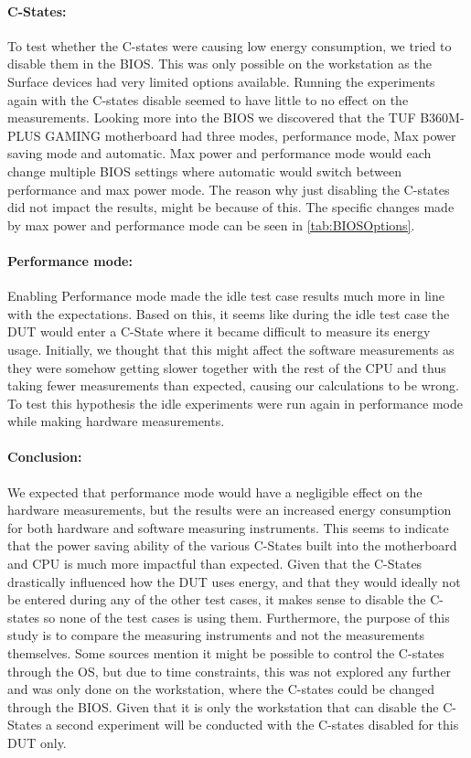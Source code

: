 \paragraph{C-States:} To test whether the C-states were causing low energy consumption, we tried to disable them in the BIOS. This was only possible on the workstation as the Surface devices had very limited options available. Running the experiments again with the C-states disable seemed to have little to no effect on the measurements. Looking more into the BIOS we discovered that the TUF B360M-PLUS GAMING motherboard had three modes, performance mode, Max power saving mode and automatic. Max power and performance mode would each change multiple BIOS settings where automatic would switch between performance and max power mode. The reason why just disabling the C-states did not impact the results, might be because of this. The specific changes made by max power and performance mode can be seen in \cref{tab:BIOSOptions}.



\paragraph{Performance mode:} Enabling Performance mode made the idle test case results much more in line with the expectations. Based on this, it seems like during the idle test case the DUT would enter a C-State where it became difficult to measure its energy usage. Initially, we thought that this might affect the software measurements as they were somehow getting slower together with the rest of the CPU and thus taking fewer measurements than expected, causing our calculations to be wrong. To test this hypothesis the idle experiments were run again in performance mode while making hardware measurements. 

\paragraph{Conclusion:} We expected that performance mode would have a negligible effect on the hardware measurements, but the results were an increased energy consumption for both hardware and software measuring instruments. This seems to indicate that the power saving ability of the various C-States built into the motherboard and CPU is much more impactful than expected. Given that the C-States drastically influenced how the DUT uses energy, and that they would ideally not be entered during any of the other test cases, it makes sense to disable the C-states so none of the test cases is using them. Furthermore, the purpose of this study is to compare the measuring instruments and not the measurements themselves. Some sources mention it might be possible to control the C-states through the OS\cite{CMete,CLinux}, but due to time constraints, this was not explored any further and was only done on the workstation, where the C-states could be changed through the BIOS. Given that it is only the workstation that can disable the C-States a second experiment will be conducted with the C-states disabled for this DUT only.
